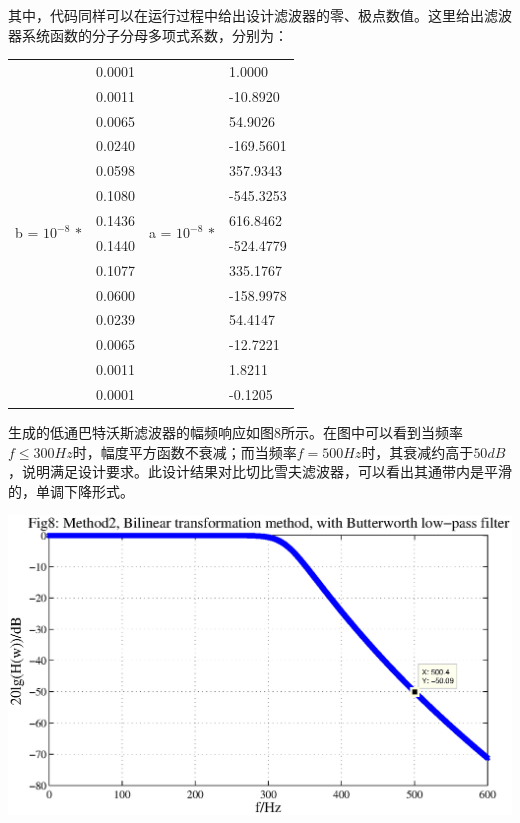 \documentclass[a4paper,11pt,onecolumn,twoside]{article}
\begin{document}
其中，代码同样可以在运行过程中给出设计滤波器的零、极点数值。这里给出滤波器系统函数的分子分母多项式系数，分别为：

\vspace{0.2cm}
\begin{center}
\begin{tabular}{|l|l|l|l|}
  \hline
  \multirow{14}{2cm}{b = $10^{-8}$ $\ast$}
                & 0.0001 &
  \multirow{14}{2cm}{a = $10^{-8}$ $\ast$} & 1.0000\\
                & 0.0011 &  & -10.8920\\
                & 0.0065 &  & 54.9026\\
                & 0.0240 &  & -169.5601\\
                & 0.0598 &  & 357.9343\\
                & 0.1080 &  & -545.3253\\
                & 0.1436 &  & 616.8462\\
                & 0.1440 &  & -524.4779\\
                & 0.1077 &  & 335.1767\\
                & 0.0600 &  & -158.9978\\
                & 0.0239 &  & 54.4147\\
                & 0.0065 &  & -12.7221\\
                & 0.0011 &  & 1.8211\\
                & 0.0001 &  & -0.1205\\
  \hline
\end{tabular}
\end{center}
\vspace{0.2cm}

生成的低通巴特沃斯滤波器的幅频响应如图8所示。在图中可以看到当频率$f\leq 300Hz$时，幅度平方函数不衰减；而当频率$f=500Hz$时，其衰减约高于$50dB$，说明满足设计要求。此设计结果对比切比雪夫滤波器，可以看出其通带内是平滑的，单调下降形式。
\begin{center}
    \includegraphics[width=1\textwidth]{fig8.eps}
\end{center}
\end{document}
